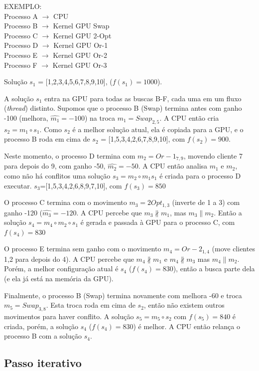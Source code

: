 EXEMPLO:\\
 Processo A $\rightarrow$ CPU\\
 Processo B $\rightarrow$ Kernel GPU Swap\\
 Processo C $\rightarrow$ Kernel GPU 2-Opt\\
 Processo D $\rightarrow$ Kernel GPU Or-1\\
 Processo E $\rightarrow$ Kernel GPU Or-2\\
 Processo F $\rightarrow$ Kernel GPU Or-3

Solução $s_1$ = [1,2,3,4,5,6,7,8,9,10], ($f(s_1) = 1000$).

A solução $s_1$ entra na GPU para todas as buscas B-F, cada uma em um fluxo (\emph{thread}) distinto.
Supomos que o processo B (Swap) termina antes com ganho -100 (melhora, $\widehat{m_1} = -100$) na troca $m_1 = Swap_{2,5}$.
A CPU então cria $s_2 = m_1 \circ s_1$.
Como $s_2$ é a melhor solução atual, ela é copiada para a GPU, e o processo B roda em cima de $s_2$ = [1,5,3,4,2,6,7,8,9,10], com $f(s_2) = 900$.

Neste momento, o processo D termina com $m_2 = Or-1_{7,9}$, movendo cliente 7 para depois do 9, com ganho -50, $\widehat{m_2} = -50$.
A CPU então analisa $m_1$ e $m_2$, como não há conflitos uma solução $s_3 = m_2 \circ m_1 s_1$ é criada para o processo D executar. $s_3$=[1,5,3,4,2,6,8,9,7,10], com $f(s_3) = 850$

O processo C termina com o movimento $m_3=2Opt_{1,3}$ (inverte de 1 a 3) com ganho -120 ($\widehat{m_3} = -120$.
A CPU percebe que $m_3 \nparallel m_1$, mas $m_3 \parallel m_2$.
Então a solução $s_4= m_4 \circ m_2 \circ s_1$ é gerada e passada à GPU para o processo C, com $f(s_4) = 830$

O processo E termina sem ganho com o movimento $m_4 = Or-2_{1,4}$ (move clientes 1,2 para depois do 4).
A CPU percebe que $m_4 \nparallel m_1$ e $m_4 \nparallel m_3$ mas $m_4 \parallel m_2$.
Porém, a melhor configuração atual é $s_4$ ($f(s_4)=830$), então a busca parte dela (e ela já está na memória da GPU).

Finalmente, o processo B (Swap) termina novamente com melhora -60 e troca $m_5=Swap_{3,8}$.
Esta troca roda em cima de $s_2$, então não existem outros movimentos para haver conflito.
A solução $s_5 = m_5 \circ s_2$ com $f(s_5) = 840$ é criada, porém, a solução $s_4$ ($f(s_4) = 830$) é melhor.
A CPU então relança o processo B com a solução $s_4$.

\subsection{Passo iterativo}

